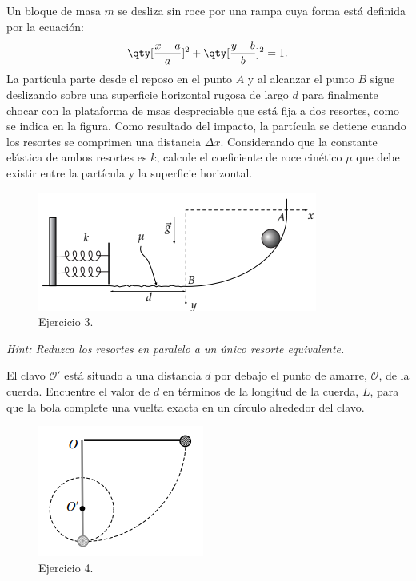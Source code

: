 \begin{mdframed}[style=warning]
	\begin{ejercicio}
		Un bloque de masa $m$ se desliza sin roce por una rampa cuya forma está definida por la ecuación:
			$$ \qty[\frac{x - a}{a}]^2 + \qty[\frac{y - b}{b}]^2 = 1. $$
		La partícula parte desde el reposo en el punto $A$ y al alcanzar el punto $B$ sigue deslizando sobre una superficie horizontal rugosa de largo $d$ para finalmente chocar con la plataforma de msas despreciable que está fija a dos resortes, como se indica en la figura. Como resultado del impacto, la partícula se detiene cuando los resortes se comprimen una distancia $\Delta x$. Considerando que la constante elástica de ambos resortes es $k$, calcule el coeficiente de roce cinético $\mu$ que debe existir entre la partícula y la superficie horizontal.
		\begin{figure}[H]
			\centering
			\includegraphics[scale=0.5]{./img/p1.png}
			\caption{Ejercicio 3.}
		\end{figure}
	\end{ejercicio}
	\textit{Hint: Reduzca los resortes en paralelo a un único resorte equivalente.}
\end{mdframed}










\begin{mdframed}[style=warning]
	\begin{ejercicio}
		El clavo $\mathcal{O}'$ está situado a una distancia $d$ por debajo el punto de amarre, $\mathcal{O}$, de la cuerda. Encuentre el valor de $d$ en términos de la longitud de la cuerda, $L$, para que la bola complete una vuelta exacta en un círculo alrededor del clavo.
		\begin{figure}[H]
			\centering
			\includegraphics[scale=0.5]{./img/p2.png}
			\caption{Ejercicio 4.}
		\end{figure}
	\end{ejercicio}
\end{mdframed}












